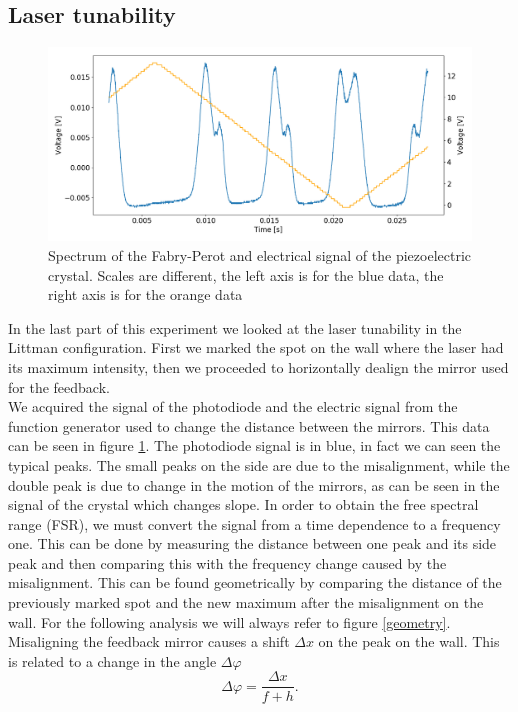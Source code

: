 \documentclass[a4paper,10pt]{article}
\begin{document}
\subsection{Laser tunability}
\begin{figure}[H]
\centering
\includegraphics[width=\textwidth]{fabryperot.png}
\caption{Spectrum of the Fabry-Perot and electrical signal of the piezoelectric crystal. Scales are different, the left axis is for the blue data, the right axis is for the orange data}\label{fabryperot}
\end{figure}
In the last part of this experiment we looked at the laser tunability in the Littman configuration. First we marked the spot on the wall where the laser had its maximum intensity, then we proceeded to horizontally dealign the mirror used for the feedback.\\
We acquired the signal of the photodiode and the electric signal from the function generator used to change the distance between the mirrors. This data can be seen in figure \ref{fabryperot}. The photodiode signal is in blue, in fact we can seen the typical peaks. The small peaks on the side are due to the misalignment, while the double peak is due to change in the motion of the mirrors, as can be seen in the signal of the crystal which changes slope. In order to obtain the free spectral range (FSR), we must convert the signal from a time dependence to a frequency one. This can be done by measuring the distance between one peak and its side peak and then comparing this with the frequency change caused by the misalignment. This can be found geometrically by comparing the distance of the previously marked spot and the new maximum after the misalignment on the wall. For the following analysis we will always refer to figure \ref{geometry}. Misaligning the feedback mirror causes a shift $\Delta x$ on the peak on the wall. This is related to a change in the angle $\Delta \varphi$
\begin{equation}\Delta \varphi = \frac{\Delta x}{f+h}.\end{equation}
\end{document}
